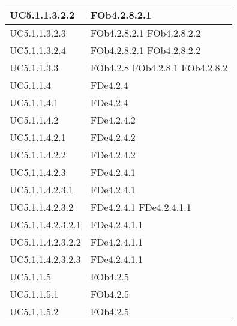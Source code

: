 \begin{longtable}{|l|p{4cm}|}
\hline
		UC5.1.1.3.2.2 & FOb4.2.8.2.1 \linebreak   \\
\hline
		UC5.1.1.3.2.3 & FOb4.2.8.2.1 \linebreak  FOb4.2.8.2.2 \linebreak   \\
\hline
		UC5.1.1.3.2.4 & FOb4.2.8.2.1 \linebreak  FOb4.2.8.2.2 \linebreak   \\
\hline
		UC5.1.1.3.3 & FOb4.2.8 \linebreak  FOb4.2.8.1 \linebreak  FOb4.2.8.2 \linebreak   \\
\hline
		UC5.1.1.4 & FDe4.2.4 \linebreak   \\
\hline
		UC5.1.1.4.1 & FDe4.2.4 \linebreak   \\
\hline
		UC5.1.1.4.2 & FDe4.2.4.2 \linebreak   \\
\hline
		UC5.1.1.4.2.1 & FDe4.2.4.2 \linebreak   \\
\hline
		UC5.1.1.4.2.2 & FDe4.2.4.2 \linebreak   \\
\hline
		UC5.1.1.4.2.3 & FDe4.2.4.1 \linebreak   \\
\hline
		UC5.1.1.4.2.3.1 & FDe4.2.4.1 \linebreak   \\
\hline
		UC5.1.1.4.2.3.2 & FDe4.2.4.1 \linebreak  FDe4.2.4.1.1 \linebreak   \\
\hline
		UC5.1.1.4.2.3.2.1 & FDe4.2.4.1.1 \linebreak   \\
\hline
		UC5.1.1.4.2.3.2.2 & FDe4.2.4.1.1 \linebreak   \\
\hline
		UC5.1.1.4.2.3.2.3 & FDe4.2.4.1.1 \linebreak   \\
\hline
		UC5.1.1.5 & FOb4.2.5 \linebreak   \\
\hline
		UC5.1.1.5.1 & FOb4.2.5 \linebreak   \\
\hline
		UC5.1.1.5.2 & FOb4.2.5 \linebreak   \\

\end{longtable}
